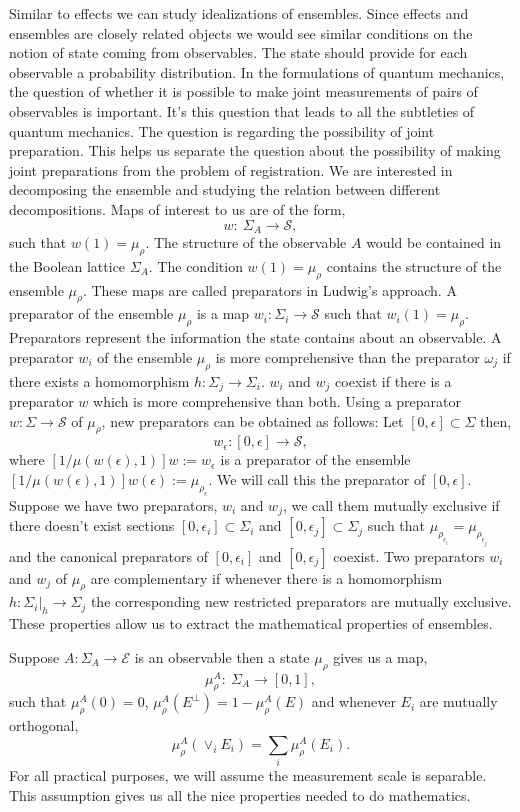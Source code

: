 \documentclass[11pt]{report}
\begin{document}
			Similar to effects we can study idealizations of ensembles. Since effects and ensembles are closely related objects we would see similar conditions on the notion of state coming from observables. 
			The state should provide for each observable a probability distribution. In the formulations of quantum mechanics, the question of whether it is possible to make joint measurements of pairs of observables is important. It's this question that leads to all the subtleties of quantum mechanics. The question is regarding the possibility of joint preparation. This helps us separate the question about the possibility of making joint preparations from the problem of registration. We are interested in decomposing the ensemble and studying the relation between different decompositions. Maps of interest to us are of the form, 
			$$w: \:\Sigma_A\to \mathcal{S},$$
			such that $w(1)= \mu_\rho$. The structure of the observable $A$ would be contained in the Boolean lattice $\Sigma_A$. The condition $w(1)=\mu_\rho$ contains the structure of the ensemble $\mu_\rho$. These maps are called preparators in Ludwig's approach. A preparator of the ensemble $\mu_\rho$ is a map $w_i:\Sigma _i\to \mathcal{S}$ such that $w_i(1)=\mu_\rho$. Preparators represent the information the state contains about an observable. A preparator $w_i$ of the ensemble $\mu_\rho$ is more comprehensive than the preparator $\omega_j$ if there exists a homomorphism $h:\Sigma_j\to\Sigma_i$. $w_i$ and $w_j$ coexist if there is a preparator $w$ which is more comprehensive than both. Using a preparator $w:\Sigma\to \mathcal{S}$ of $\mu_\rho$, new preparators can be obtained as follows: Let $[0,\epsilon]\subset  \Sigma$ then, 
			$$w_\epsilon:[0,\epsilon]\to \mathcal{S},$$
			where $[1/\mu(w(\epsilon),1)]w:=w_\epsilon$ is a preparator of the ensemble $[1/\mu(w(\epsilon),1)]w(\epsilon):=\mu_{\rho_\epsilon}$. We will call this the preparator of $[0,\epsilon]$. Suppose we have two preparators, $w_i$ and $w_j$, we call them mutually exclusive if there doesn't exist sections $[0,\epsilon_i]\subset \Sigma_i$ and $[0,\epsilon_j]\subset \Sigma_j$ such that $\mu_{\rho_{\epsilon_i}}=\mu_{\rho_{\epsilon_j}}$ and the canonical preparators of $[0,\epsilon_i]$ and $[0,\epsilon_j]$ coexist. Two preparators $w_i$ and $w_j$ of $\mu_\rho$ are complementary if whenever there is a homomorphism $h :\Sigma_i|_h\to\Sigma_j$ the corresponding new restricted preparators are mutually exclusive. These properties allow us to extract the mathematical properties of ensembles. 
			
			Suppose $A:\Sigma_A\to \mathcal{E}$ is an observable then a state $\mu_\rho$  gives us a map,
			$$\mu^A_\rho:\:\Sigma_A\to [0,1],$$ 
			such that $\mu^A_\rho(0)=0$, $\mu^A_\rho(E^\perp)=1-\mu^A_\rho(E)$ and whenever $E_i$ are mutually orthogonal,
			$$\mu^A_\rho(\vee_i E_i)=\sum_i\mu^A_\rho(E_i).$$
			For all practical purposes, we will assume the measurement scale is separable. This assumption gives us all the nice properties needed to do mathematics.
			
\end{document}
